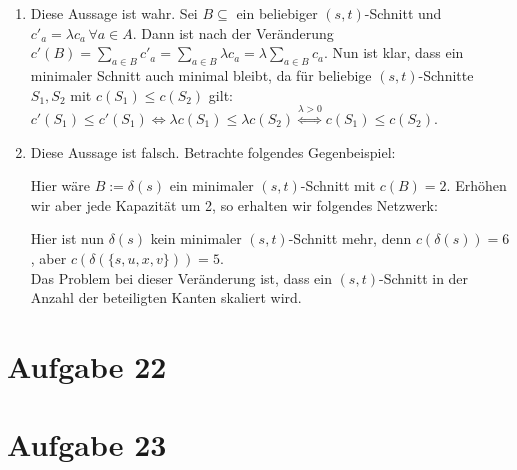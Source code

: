 \documentclass[a4paper,12pt,german]{scrartcl}
\begin{document}
\begin{enumerate}
  \item Diese Aussage ist wahr. Sei $B\subseteq$ ein beliebiger $(s,t)$-Schnitt und $c'_a=\lambda c_a\,\forall a\in A$. Dann ist nach der Veränderung $c'(B)=\sum\limits_{a\in B}c'_a=\sum\limits_{a\in B}\lambda c_a=\lambda\sum\limits_{a\in B}c_a$. Nun ist klar, dass ein minimaler Schnitt auch minimal bleibt, da für beliebige $(s,t)$-Schnitte $S_1,S_2$ mit $c(S_1)\leq c(S_2)$ gilt: $c'(S_1)\leq c'(S_1)\iff \lambda c(S_1)\leq \lambda c(S_2)\stackrel{\lambda>0}{\iff}c(S_1)\leq c(S_2)$.
  \item Diese Aussage ist falsch. Betrachte folgendes Gegenbeispiel:
    \begin{center}
    \end{center}
    Hier wäre $B:=\delta(s)$ ein minimaler $(s,t)$-Schnitt mit $c(B)=2$. Erhöhen wir aber jede Kapazität um 2, so erhalten wir folgendes Netzwerk:
        \begin{center}
    \end{center}
    Hier ist nun $\delta(s)$ kein minimaler $(s,t)$-Schnitt mehr, denn $c(\delta(s))=6$, \linebreak aber $c(\delta(\{s,u,x,v\}))=5$.\\
    Das Problem bei dieser Veränderung ist, dass  ein $(s,t)$-Schnitt in der Anzahl der beteiligten Kanten skaliert wird.
  \end{enumerate}  
  
\section*{Aufgabe 22}
\section*{Aufgabe 23}
\end{document}
